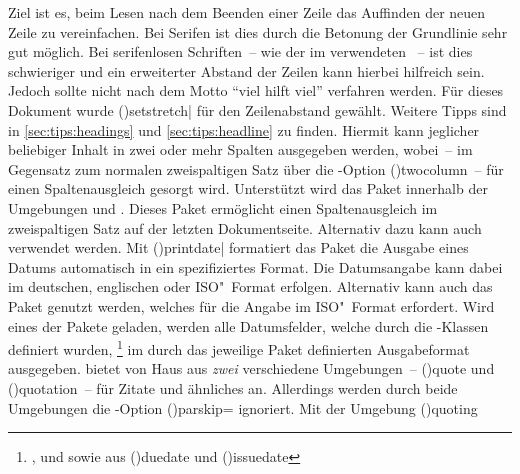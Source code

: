 \begin{DeclarePackages}[Typografie]
  Ziel ist es, beim Lesen nach dem Beenden einer Zeile das Auffinden der neuen 
  Zeile zu vereinfachen. Bei Serifen ist dies durch die Betonung der Grundlinie 
  sehr gut möglich. Bei serifenlosen Schriften~-- wie der im \TUDCD verwendeten 
  \OpenSans~-- ist dies schwieriger und ein erweiterter Abstand der Zeilen kann 
  hierbei hilfreich sein. Jedoch sollte nicht nach dem Motto 
  \enquote{viel hilft viel} verfahren werden. Für dieses Dokument wurde 
  \Macro(){setstretch|\MPValue{\baselinestretch}} für 
  den Zeilenabstand gewählt. Weitere Tipps sind in \autoref{sec:tips:headings} 
  und \autoref{sec:tips:headline} zu finden.
  Hiermit kann jeglicher beliebiger Inhalt in zwei oder mehr Spalten ausgegeben 
  werden, wobei~-- im Gegensatz zum normalen zweispaltigen Satz über die
  \KOMAScript-Option \Option(){twocolumn}~-- für einen 
  Spaltenausgleich gesorgt wird. Unterstützt wird das Paket innerhalb der 
  Umgebungen  und .
  Dieses Paket ermöglicht einen Spaltenausgleich im zweispaltigen Satz auf der 
  letzten Dokumentseite. Alternativ dazu kann auch  verwendet 
  werden.
  Mit \Macro(){printdate|} formatiert 
  das Paket  die Ausgabe eines Datums automatisch in ein 
  spezifiziertes Format. Die Datumsangabe kann dabei im deutschen, englischen 
  oder ISO"~Format erfolgen. Alternativ kann auch das Paket 
  genutzt werden, welches für  die Angabe im 
  ISO"~Format erfordert. Wird eines der Pakete geladen, werden alle Datumsfelder, 
  welche durch die \TUDScript-Klassen definiert wurden,%
  \footnote{%
    ,  und  sowie aus 
     \Macro(){duedate} und 
    \Macro(){issuedate}%
  }
  im durch das jeweilige Paket definierten Ausgabeformat ausgegeben.
   bietet von Haus aus \emph{zwei} verschiedene Umgebungen~-- 
  \Environment(){quote} und 
  \Environment(){quotation}~-- für Zitate und 
  ähnliches an. Allerdings werden durch beide Umgebungen die \KOMAScript-Option 
  \Option(){parskip=\PMisc} ignoriert. 
  Mit der Umgebung \Environment(){quoting} 

\end{DeclarePackages}
